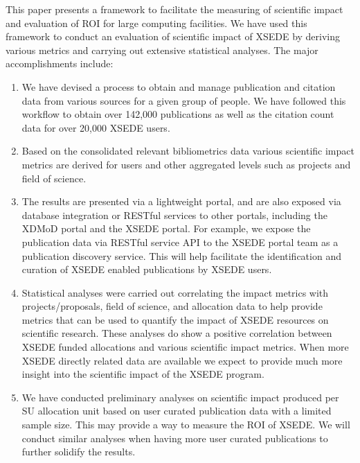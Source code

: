 \documentclass{sig-alternate}
\begin{document}
This paper presents a framework to facilitate the measuring of scientific impact and evaluation of ROI for large computing facilities. We have used this framework to conduct an evaluation of scientific impact of XSEDE by deriving various metrics and carrying out extensive statistical analyses. The major accomplishments include:

\begin{enumerate}

\item We have devised a process to obtain and manage publication and citation data from various sources for a given group of people. We have followed this workflow to obtain over 142,000 publications as well as the citation count data for over 20,000 XSEDE users.

\item Based on the consolidated relevant bibliometrics data various scientific impact metrics are derived for users and other aggregated levels such as projects and field of science.

\item The results are presented via a lightweight portal, and are also exposed via database integration or RESTful services to other portals, including the XDMoD portal and the XSEDE portal. For example, we expose the publication data via RESTful service API to the XSEDE portal team as a publication discovery service. This will help facilitate the identification and curation of XSEDE enabled publications by XSEDE users.

\item Statistical analyses were carried out correlating the impact metrics with projects/proposals, field of science, and allocation data to help provide metrics that can be used to quantify the impact of XSEDE resources on scientific research. These analyses do show a positive correlation between XSEDE funded allocations and various scientific impact metrics. When more XSEDE directly related data are available we expect to provide much more insight into the scientific impact of the XSEDE program.

\item We have conducted preliminary analyses on scientific impact produced per SU allocation unit based on user curated publication data with a limited sample size. This may provide a way to measure the ROI of XSEDE. We will conduct similar analyses when having more user curated publications to further solidify the results.

\end{enumerate} 
\end{document}
